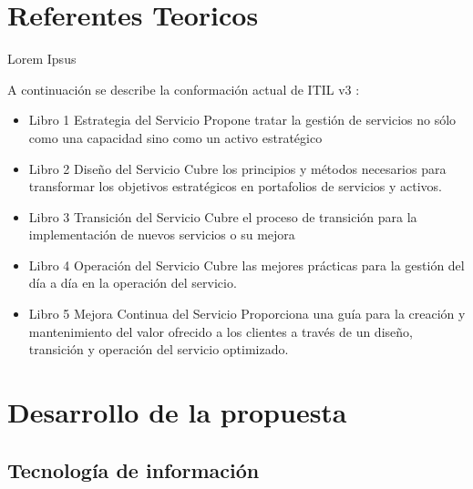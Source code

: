 \documentclass[preprint,12pt]{elsarticle}
\begin{document}
 


\section{Referentes Teoricos}
Lorem Ipsus

A continuación se describe la conformación actual de ITIL v3 :
\begin{itemize}
\item Libro 1  Estrategia del Servicio 
Propone tratar la gestión de servicios no sólo como una capacidad sino como un activo estratégico
\item Libro 2 Diseño del Servicio
Cubre los principios y métodos necesarios para transformar los objetivos estratégicos en portafolios de servicios y activos.
\item Libro 3 Transición del Servicio
Cubre el proceso de transición para la implementación de nuevos servicios o su mejora
\item Libro 4 Operación del Servicio
Cubre las mejores prácticas para la gestión del día a día en la operación del servicio.
\item Libro 5 Mejora Continua del Servicio
Proporciona una guía para la creación y mantenimiento del valor ofrecido a los clientes a través de un diseño, transición y operación del servicio optimizado.
\end{itemize}
\cite{Rios2007}
 



\section{Desarrollo de la propuesta}


\subsection{\textbf{Tecnología de información}}
\end{document}
